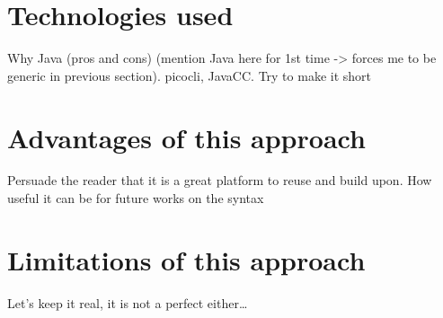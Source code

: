\section{Technologies used}\label{sec:ch2TechStack}
Why Java (pros and cons) (mention Java here for 1st time -> forces me to be generic in previous section). picocli, JavaCC.\newline
Try to make it short

\section{Advantages of this approach}\label{sec:ch2CompilerPros}
Persuade the reader that it is a great platform to reuse and build upon.
How useful it can be for future works on the syntax

\section{Limitations of this approach}\label{sec:ch2CompilerCons}
Let's keep it real, it is not a perfect either\ldots